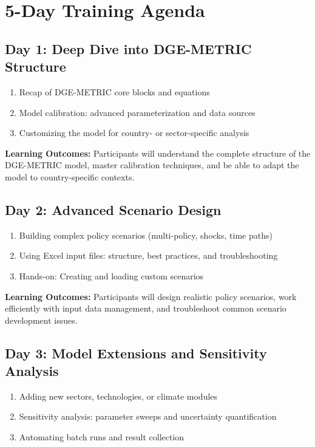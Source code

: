 \documentclass[11pt]{article}
\begin{document}
\section*{5-Day Training Agenda}

\subsection*{Day 1: Deep Dive into DGE-METRIC Structure}

\begin{enumerate}
    \item Recap of DGE-METRIC core blocks and equations
    \item Model calibration: advanced parameterization and data sources
    \item Customizing the model for country- or sector-specific analysis
\end{enumerate}

\textbf{Learning Outcomes:} Participants will understand the complete structure of the DGE-METRIC model, master calibration techniques, and be able to adapt the model to country-specific contexts.

\subsection*{Day 2: Advanced Scenario Design}

\begin{enumerate}
    \item Building complex policy scenarios (multi-policy, shocks, time paths)
    \item Using Excel input files: structure, best practices, and troubleshooting
    \item Hands-on: Creating and loading custom scenarios
\end{enumerate}

\textbf{Learning Outcomes:} Participants will design realistic policy scenarios, work efficiently with input data management, and troubleshoot common scenario development issues.

\subsection*{Day 3: Model Extensions and Sensitivity Analysis}

\begin{enumerate}
    \item Adding new sectors, technologies, or climate modules
    \item Sensitivity analysis: parameter sweeps and uncertainty quantification
    \item Automating batch runs and result collection
\end{enumerate}
\end{document}
